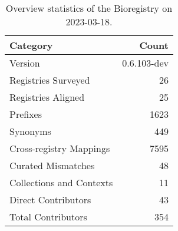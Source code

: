 \begin{table}
\centering
\caption{Overview statistics of the Bioregistry on 2023-03-18.}
\label{tab:bioregistry-summary}
\begin{tabular}{lr}
\toprule
                Category &       Count \\
\midrule
                 Version & 0.6.103-dev \\
     Registries Surveyed &          26 \\
      Registries Aligned &          25 \\
                Prefixes &        1623 \\
                Synonyms &         449 \\
 Cross-registry Mappings &        7595 \\
      Curated Mismatches &          48 \\
Collections and Contexts &          11 \\
     Direct Contributors &          43 \\
      Total Contributors &         354 \\
\bottomrule
\end{tabular}
\end{table}
